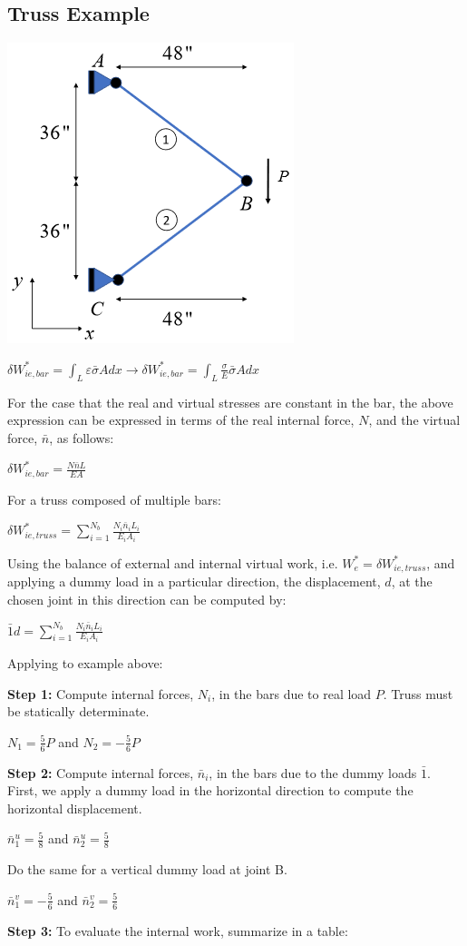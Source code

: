 \documentclass{article}
\begin{document}
\begin{multicols*}{2}
    \subsection*{Truss Example}
    
    \includegraphics[width=0.5\linewidth]{Figures/Truss_Example_VF.png}

    $\delta W_{ie,bar}^*=\int_L \varepsilon \bar{\sigma} A dx\rightarrow 
    \delta W_{ie,bar}^*=\int_L \frac{\sigma}{E} \bar{\sigma} A dx$\par 
    For the case that the real and virtual stresses are constant in the bar, the 
    above expression can be expressed in terms of the real internal force, $N$, 
    and the virtual force, $\bar{n}$, as follows:\par 
    $\delta W_{ie,bar}^*=\frac{N\bar{n}L}{EA}$\par 
    For a truss composed of multiple bars:\par 
    $\delta W_{ie,truss}^* = \sum\limits_{i=1}^{N_b} \frac{N_i \bar{n}_i L_i}{E_i A_i}$\par 
    Using the balance of external and internal virtual work, i.e. $W_e^*=\delta 
    W_{ie,truss}^*$, and applying a dummy load in a particular direction, the 
    displacement, $d$, at the chosen joint in this direction can be computed by:\par 
    $\bar{1}d=\sum\limits_{i=1}^{N_b} \frac{N_i \bar{n}_i L_i}{E_i A_i}$\par
    Applying to example above:\par 
    \textbf{Step 1:} Compute internal forces, $N_i$, in the bars due to real load $P$. 
    Truss must be statically determinate.\par 
    $N_1=\frac{5}{6}P$ and $N_2=-\frac{5}{6}P$ \par 
    \textbf{Step 2:} Compute internal forces, $\bar{n}_i$, in the bars due to the 
    dummy loads $\bar{1}$. First, we apply a dummy load in the horizontal direction
    to compute the horizontal displacement.\par 
    $\bar{n}_1^u = \frac{5}{8}$ and $\bar{n}_2^u=\frac{5}{8}$ \par 
    Do the same for a vertical dummy load at joint B. \par 
    $\bar{n}_1^v = -\frac{5}{6}$ and $\bar{n}_2^v=\frac{5}{6}$\par 
    \textbf{Step 3:} To evaluate the internal work, summarize in a table: 
     

\end{multicols*}
\end{document}
